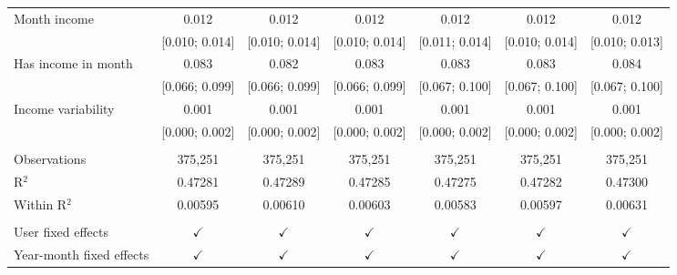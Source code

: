 \begin{tabular}{lcccccc}
   Month income                   & 0.012          & 0.012          & 0.012          & 0.012           & 0.012            & 0.012\\   
                                  & [0.010; 0.014] & [0.010; 0.014] & [0.010; 0.014] & [0.011; 0.014]  & [0.010; 0.014]   & [0.010; 0.013]\\   
   Has income in month            & 0.083          & 0.082          & 0.083          & 0.083           & 0.083            & 0.084\\   
                                  & [0.066; 0.099] & [0.066; 0.099] & [0.066; 0.099] & [0.067; 0.100]  & [0.067; 0.100]   & [0.067; 0.100]\\   
   Income variability             & 0.001          & 0.001          & 0.001          & 0.001           & 0.001            & 0.001\\   
                                  & [0.000; 0.002] & [0.000; 0.002] & [0.000; 0.002] & [0.000; 0.002]  & [0.000; 0.002]   & [0.000; 0.002]\\   
    \\
   Observations                   & 375,251        & 375,251        & 375,251        & 375,251         & 375,251          & 375,251\\  
   R$^2$                          & 0.47281        & 0.47289        & 0.47285        & 0.47275         & 0.47282          & 0.47300\\  
   Within R$^2$                   & 0.00595        & 0.00610        & 0.00603        & 0.00583         & 0.00597          & 0.00631\\  
    \\
   User fixed effects             & $\checkmark$   & $\checkmark$   & $\checkmark$   & $\checkmark$    & $\checkmark$     & $\checkmark$\\   
   Year-month fixed effects       & $\checkmark$   & $\checkmark$   & $\checkmark$   & $\checkmark$    & $\checkmark$     & $\checkmark$\\   
   \bottomrule
\end{tabular}
\par\endgroup


